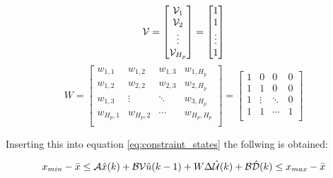 \begin{equation}
\CMcal{V}=
	\begin{bmatrix}
	  \CMcal{V}_1 	\\
	  \CMcal{V}_2 	\\
	  \vdots 			\\
	  \CMcal{V}_{H_p} 	\\
	  \end{bmatrix}
	  = 
	  \begin{bmatrix}
	  1 	\\
	  1 	\\
	  \vdots 			\\
	  1 	\\
	  \end{bmatrix}
\end{equation}
\begin{equation}
	W=	  
\begin{bmatrix}
	  w_{1,1}  & w_{1,2} & w_{1,3} & w_{1,H_p} 	\\
	  w_{1,2}  & w_{2,2} & w_{2,3} & w_{2,H_p} 	\\
	  w_{1,3}  & \vdots & \ddots & w_{3,H_p}		\\
	  w_{H_p,1} & w_{H_p,2} & \cdots & w_{H_p,H_p} 	\\
	  \end{bmatrix}=
	  \begin{bmatrix}
	  1 & 0 & 0 & 0 	\\
	  1 & 1 & 0 & 0 	\\
	  1 & \vdots & \ddots & 0		\\
	  1 & 1 & \cdots & 1 	\\
	  \end{bmatrix}
\end{equation}

Inserting this into equation \ref{eq:constraint_states} the follwing is obtained:

\begin{equation}
	x_{min}- \bar{x} \leq \CMcal{A}\hat{x}(k)+\CMcal{B}\CMcal{V}\hat{u}(k-1) +W\Delta \hat{\CMcal{U}}(k)+\CMcal{B\hat{D}}(k) \leq x_{max}-\bar{x}
 \end{equation} 



